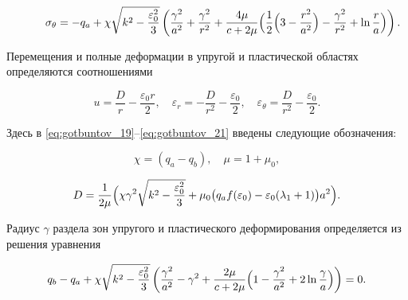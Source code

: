 \begin{itemize}
\begin{equation}
\begin{array}{l}
\\[3mm]  

\displaystyle

\sigma_{\theta}=-q_a+\chi\sqrt{k^2-\frac{\varepsilon_0^2}{3}}\left(\frac{\gamma^2}{a^2}+\frac{\gamma^2}{r^2}+\frac{4\mu}{c+2\mu}\Bigl(\frac{1}{2}\Bigl(3-\frac{r^2}{a^2}\Bigr)-\frac{\gamma^2}{r^2} +\ln\frac{r}{a}\Bigr)\right). 

\end{array}  \hspace{-10mm}

\label{eq:gotbuntov_21} 

\end{equation}





\end{itemize}



Перемещения и полные деформации в упругой и пластической областях определяются соотношениями 

\begin{equation} 

\label{eq:gotbuntov_21} 

u=\frac{D}{r}-\frac{\varepsilon_0 r}{2}, \quad \varepsilon_r=-\frac{D}{r^2}-\frac{\varepsilon_0}{2}, \quad \varepsilon_{\theta}=\frac{D}{r^2}-\frac{\varepsilon_0}{2}. 

\end{equation}

Здесь в \eqref{eq:gotbuntov_19}--\eqref{eq:gotbuntov_21} введены следующие обозначения: 

$$

\chi=(q_a-q_b), \quad  \mu=1+\mu_0, $$ 

$$D=\frac{1}{2\mu} \Bigl( 

\chi\gamma^2\sqrt{k^2-\frac{\varepsilon_0^2}3}+\mu_0 \bigl(q_a   f(\varepsilon_0)-\varepsilon_0(\lambda_1+1)\bigr)a^2

\Bigr).

$$



Радиус $\gamma$ раздела зон упругого и пластического деформирования определяется из решения уравнения

\begin{equation} 

\label{eq:gotbuntov_22} 

q_b-q_a+\chi\sqrt{k^2-\frac{\varepsilon_0^2}{3}}\left(\frac{\gamma^2}{a^2}-\gamma^2+\frac{2\mu}{c+2\mu}\Bigl(1-\frac{\gamma^2}{a^2}+2\ln\frac{\gamma}{a}\Bigr)\right)=0. 

\end{equation}     



